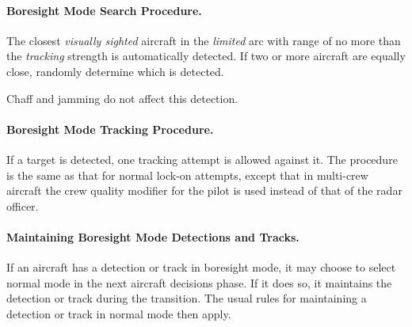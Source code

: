 {\begin{advancedrules}
\begin{itemize}
\end{itemize}

\paragraph{Boresight Mode Search Procedure.}


The closest \emph{visually sighted} aircraft in the \emph{limited} arc with range of no more than the \emph{tracking} strength is automatically detected. If two or more aircraft are equally close, randomly determine which is detected. 

Chaff and jamming do not affect this detection. 

\paragraph{Boresight Mode Tracking Procedure.}

If a target is detected, one tracking attempt is allowed against it. The procedure is the same as that for normal lock-on attempts, except that in  multi-crew aircraft the crew quality modifier for the pilot is used instead of that of the radar officer.


\paragraph{Maintaining Boresight Mode Detections and Tracks.}

If an aircraft has a detection or track in boresight mode, it may choose to select normal mode in the next aircraft decisions phase. If it does so, it maintains the detection or track during the transition. The usual rules for maintaining a detection or track in normal mode then apply.


\end{advancedrules}}
